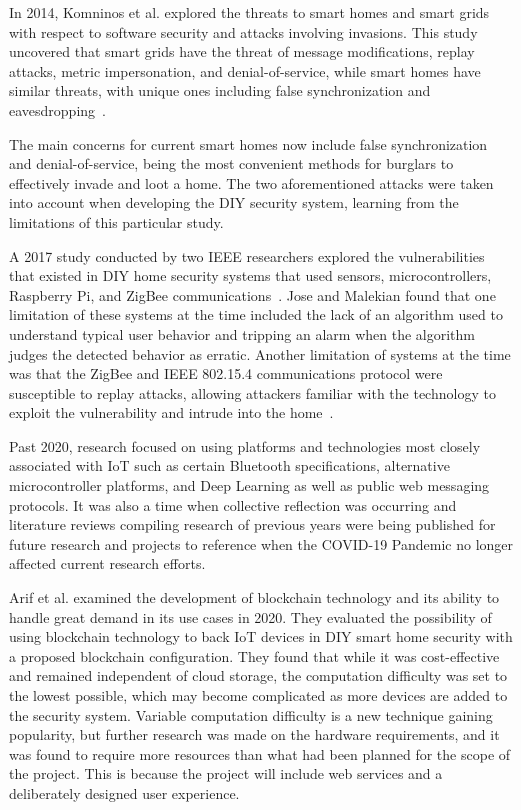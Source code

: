 In 2014, Komninos et al. explored the threats to smart homes and smart grids with respect to
software security and attacks involving invasions. This study uncovered that smart grids have
the threat of message modifications, replay attacks, metric impersonation, and
denial-of-service, while smart homes have similar threats, with unique ones including
false synchronization and eavesdropping~\cite{komninosEtAl2014}.

The main concerns for current smart homes now include false synchronization and
denial-of-service, being the most convenient methods for burglars to effectively invade and
loot a home. The two aforementioned attacks were taken into account when developing the DIY
security system, learning from the limitations of this particular study.

A 2017 study conducted by two IEEE researchers explored the vulnerabilities that existed
in DIY home security systems that used sensors, microcontrollers, Raspberry Pi, and ZigBee
communications~\cite{joseMalekian2017}. Jose and Malekian found that one limitation of these
systems at the time included the lack of an algorithm used to understand typical
user behavior and tripping an alarm when the algorithm judges the detected behavior as
erratic. Another limitation of systems at the time was that the ZigBee and IEEE 802.15.4
communications protocol were susceptible to replay attacks, allowing attackers familiar
with the technology to exploit the vulnerability and intrude
into the home~\cite{joseMalekian2017}.

Past 2020, research focused on using platforms and technologies most closely associated with
IoT such as certain Bluetooth specifications, alternative microcontroller platforms, and Deep
Learning as well as public web messaging protocols. It was also a time when collective reflection was occurring and literature reviews compiling research of previous years were being published for future research and projects to reference when the COVID-19 Pandemic no longer affected current research efforts.

Arif et al. examined the development of blockchain technology and its ability to
handle great demand in its use cases in 2020. They evaluated the possibility of using blockchain technology to back IoT devices in DIY smart home security with a proposed blockchain configuration. They found that while it was cost-effective and remained independent of cloud storage, the computation difficulty was set to the lowest possible, which may become complicated as more devices are added to the security system.
\cite{arifEtAl_2020}
Variable computation difficulty is a new technique gaining popularity, but further
research was made on the hardware requirements, and it was found to require more
resources than what had been planned for the scope of the project.
This is because the project will include web services and a deliberately
designed user experience.

